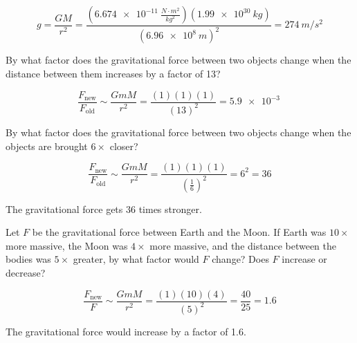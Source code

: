 \documentclass[addpoints]{exam}
\begin{document}
\begin{questions}
\begin{parts}
\begin{solution}

\begin{equation*}
    g = \frac{G M}{r^2} = \frac{(\SI{6.674e-11}{\frac{N \cdot m^2}{kg^2}})(\SI{1.99e30}{kg})}{(\SI{6.96e8}{m})^2} = \SI{274}{m/s^2} 
\end{equation*}
\end{solution}
\end{parts}

\question
By what factor does the gravitational force between two objects change when the distance between them increases by a factor of 13?

\begin{solution}

\begin{equation*}
    \frac{F_{\text{new}}}{F_{\text{old}}} \sim \frac{G m M}{r^2} = \frac{(1)(1)(1)}{(13)^2} = \SI{5.9e-3}{} 
\end{equation*}
\end{solution}

\question
By what factor does the gravitational force between two objects change when the objects are brought $6 \times$ closer?

\begin{solution}

\begin{equation*}
    \frac{F_{\text{new}}}{F_{\text{old}}} \sim \frac{G m M}{r^2} = \frac{(1)(1)(1)}{\left(\frac{1}{6}\right)^2} = 6^2 = 36
\end{equation*}

The gravitational force gets 36 times stronger.
\end{solution}

\question
Let $F$ be the gravitational force between Earth and the Moon. If Earth was $10 \times$ more massive, the Moon was $4 \times$ more massive, and the distance between the bodies was $5 \times$ greater, by what factor would $F$ change? Does $F$ increase or decrease? 

\begin{solution}

\begin{equation*}
    \frac{F_{\text{new}}}{F} \sim \frac{G m M}{r^2} = \frac{(1)(10)(4)}{(5)^2} = \frac{40}{25} = 1.6
\end{equation*}

The gravitational force would increase by a factor of 1.6.
\end{solution}


\end{questions}
\end{document}
